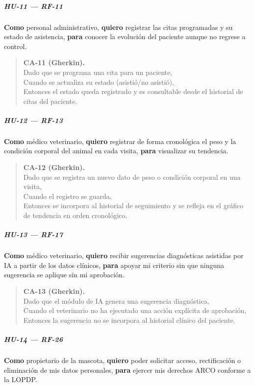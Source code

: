 \documentclass[
]{article}
\begin{document}
\subparagraph{HU-11 --- RF-11}
\textbf{Como} personal administrativo,
\textbf{quiero} registrar las citas programadas y su estado de asistencia,
\textbf{para} conocer la evolución del paciente aunque no regrese a control.

\begin{quote}
\textbf{CA-11 (Gherkin).} \\
Dado que se programa una cita para un paciente, \\
Cuando se actualiza su estado (asistió/no asistió), \\
Entonces el estado queda registrado y es consultable desde el historial de citas del paciente.
\end{quote}

\subparagraph{HU-12 --- RF-13}
\textbf{Como} médico veterinario,
\textbf{quiero} registrar de forma cronológica el peso y la condición corporal del animal en cada visita,
\textbf{para} visualizar su tendencia.

\begin{quote}
\textbf{CA-12 (Gherkin).} \\
Dado que se registra un nuevo dato de peso o condición corporal en una visita, \\
Cuando el registro se guarda, \\
Entonces se incorpora al historial de seguimiento y se refleja en el gráfico de tendencia en orden cronológico.
\end{quote}

\subparagraph{HU-13 --- RF-17}
\textbf{Como} médico veterinario,
\textbf{quiero} recibir sugerencias diagnósticas asistidas por IA a partir de los datos clínicos,
\textbf{para} apoyar mi criterio sin que ninguna sugerencia se aplique sin mi aprobación.

\begin{quote}
\textbf{CA-13 (Gherkin).} \\
Dado que el módulo de IA genera una sugerencia diagnóstica, \\
Cuando el veterinario no ha ejecutado una acción explícita de aprobación, \\
Entonces la sugerencia no se incorpora al historial clínico del paciente.
\end{quote}

\subparagraph{HU-14 --- RF-26}
\textbf{Como} propietario de la mascota,
\textbf{quiero} poder solicitar acceso, rectificación o eliminación de mis datos personales,
\textbf{para} ejercer mis derechos ARCO conforme a la LOPDP.
\end{document}
